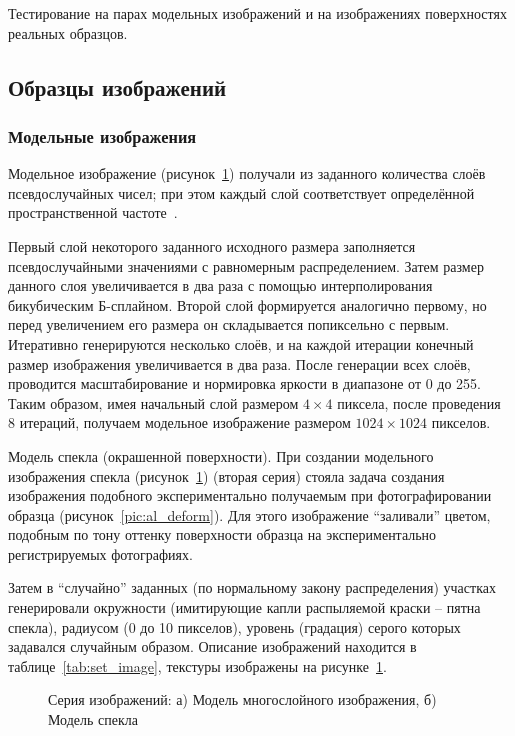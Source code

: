 Тестирование  на парах модельных изображений и на изображениях поверхностях реальных образцов.
\subsection{Образцы изображений}
\subsubsection{Модельные изображения}\label{mod_image}

Модельное изображение (рисунок~\ref{pic:gray_mix}) получали из заданного количества слоёв псевдослучайных чисел; при этом каждый слой соответствует определённой пространственной частоте~\cite{pan_15}. 

Первый слой некоторого заданного исходного размера заполняется псевдослучайными значениями с равномерным распределением. Затем размер данного слоя увеличивается в два раза с помощью интерполирования бикубическим Б-сплайном. Второй слой формируется аналогично первому, но перед увеличением его размера он складывается попиксельно с первым. 
Итеративно генерируются несколько слоёв, и на каждой итерации конечный размер изображения увеличивается в два раза. После генерации всех слоёв, проводится масштабирование и нормировка яркости в диапазоне от 0 до 255. Таким образом, имея начальный слой размером $4 \times 4$ пиксела, после проведения 8 итераций, получаем модельное изображение размером $1024 \times 1024$ пикселов.

Модель спекла (окрашенной поверхности). При создании модельного изображения спекла (рисунок~\ref{pic:gray_mix}) (вторая серия) стояла задача создания изображения подобного экспериментально получаемым при фотографировании образца (рисунок~\ref{pic:al_deform}). Для этого изображение ``заливали'' цветом, подобным по тону оттенку поверхности образца на экспериментально регистрируемых фотографиях. 

Затем в ``случайно'' заданных (по нормальному закону распределения) участках генерировали окружности (имитирующие капли распыляемой краски – пятна спекла), радиусом (0 до 10 пикселов), уровень (градация) серого которых задавался случайным образом. Описание изображений находится в таблице~\ref{tab:set_image}, текстуры изображены на рисунке~\ref{pic:gray_mix}.

\begin{figure}[h!]
\caption{Серия изображений: а) Модель многослойного изображения, б) Модель спекла}
\label{pic:gray_mix}
\end{figure}

